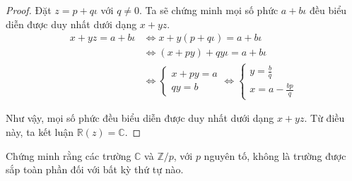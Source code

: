 \begin{proof}
    Đặt $z = p + q\iota$ với $q\ne 0$. Ta sẽ chứng minh mọi số phức $a + b\iota$ đều biểu diễn được duy nhất dưới dạng $x + yz$.
    \begin{align*}
        x + yz = a + b\iota &\Longleftrightarrow x + y(p + q\iota) = a + b\iota  \\
        &\Longleftrightarrow (x + py) + qy\iota = a + b\iota \\
        &\Longleftrightarrow
        \begin{cases}
            x + py = a \\
            qy = b
        \end{cases}
        \Longleftrightarrow
        \begin{cases}
            y = \frac{b}{q} \\
            x = a - \frac{bp}{q}
        \end{cases}
    \end{align*}
    
    Như vậy, mọi số phức đều biểu diễn được duy nhất dưới dạng $x + yz$. Từ điều này, ta kết luận $\mathbb{R}(z) = \mathbb{C}$.
\end{proof}

\begin{exercise}
    Chứng minh rằng các trường $\mathbb{C}$ và $\mathbb{Z}/p$, với $p$ nguyên tố, không là trường được sắp toàn phần đối với bất kỳ thứ tự nào.
\end{exercise}

